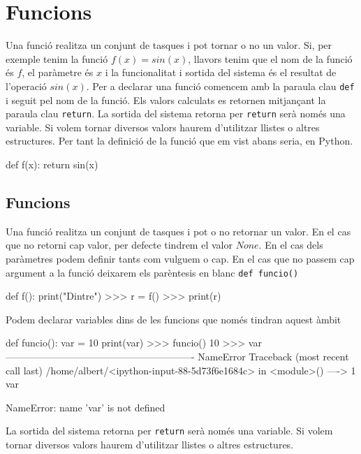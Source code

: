 \chapter{Funcions}


Una funció realitza un conjunt de tasques i pot tornar o no un valor. Si, per exemple tenim la funció $f(x) = sin(x)$, llavors tenim que el nom de la funció és $f$, el paràmetre és $x$ i la funcionalitat i sortida del sistema és el resultat de l'operació $sin(x)$. Per a declarar una funció comencem amb la paraula clau {\tt def} i seguit pel nom de la funció. Els valors calculats es retornen mitjançant la paraula clau {\tt return}. La sortida del sistema retorna per {\tt return} serà només una variable. Si volem tornar diversos valors haurem d'utilitzar llistes o altres estructures. Per tant la definició de la funció que em vist abans seria, en Python.


\begin{tip}[caption=Definició funció f()]
def f(x):
    return sin(x)
\end{tip}


\section{Funcions}

Una funció realitza un conjunt de tasques i pot o no retornar un valor. En el cas que no retorni cap valor, per defecte tindrem el valor $None$. En el cas dels paràmetres podem definir tants com vulguem o cap. En el cas que no passem cap argument a la funció deixarem els parèntesis en blanc {\tt def funcio()}

\begin{blockcode}
def f():
    print("Dintre")
>>> r = f()
>>> print(r)
\end{blockcode}



Podem declarar variables dins de les funcions que només tindran aquest àmbit


\begin{blockcode}
def funcio():
     var = 10
     print(var)
>>> funcio()
10
>>> var
----------------------------------------------------------
NameError          Traceback (most recent call last)
/home/albert/<ipython-input-88-5d73f6e1684c> in <module>()
----> 1 var

NameError: name 'var' is not defined
\end{blockcode}



La sortida del sistema retorna per {\tt return} serà només una variable. Si volem tornar diversos valors haurem d'utilitzar llistes o altres estructures.


